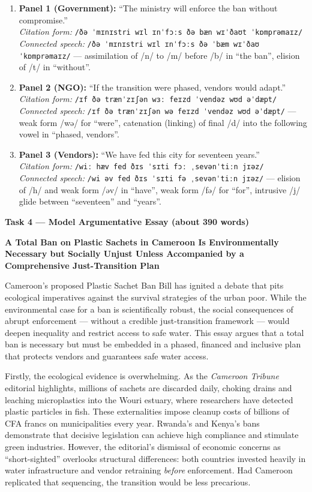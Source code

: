 \documentclass[11pt]{article}
\begin{document}
\begin{enumerate}
    \item \textbf{Panel 1 (Government):} ``The ministry will enforce the ban without compromise.'' \\
    \textit{Citation form:} \texttt{/ðə ˈmɪnɪstri wɪl ɪnˈfɔːs ðə bæn wɪˈðaʊt ˈkɒmprəmaɪz/} \\
    \textit{Connected speech:} \texttt{/ðə ˈmɪnɪstri wɪl ɪnˈfɔːs ðə ˈbæm wɪˈðaʊ ˈkɒmprəmaɪz/} --- assimilation of /n/ to /m/ before /b/ in ``the ban'', elision of /t/ in ``without''.
    \item \textbf{Panel 2 (NGO):} ``If the transition were phased, vendors would adapt.'' \\
    \textit{Citation form:} \texttt{/ɪf ðə trænˈzɪʃən wɜː feɪzd ˈvendəz wʊd əˈdæpt/} \\
    \textit{Connected speech:} \texttt{/ɪf ðə trænˈzɪʃən wə feɪzd ˈvendəz wʊd əˈdæpt/} --- weak form /wə/ for ``were'', catenation (linking) of final /d/ into the following vowel in ``phased, vendors''.
    \item \textbf{Panel 3 (Vendors):} ``We have fed this city for seventeen years.'' \\
    \textit{Citation form:} \texttt{/wiː hæv fed ðɪs ˈsɪti fɔː ˌsevənˈtiːn jɪəz/} \\
    \textit{Connected speech:} \texttt{/wi əv fed ðɪs ˈsɪti fə ˌsevənˈtiːn jɪəz/} --- elision of /h/ and weak form /əv/ in ``have'', weak form /fə/ for ``for'', intrusive /j/ glide between ``seventeen'' and ``years''.
\end{enumerate}

\textbf{Task 4 --- Model Argumentative Essay (about 390 words)}

\textbf{A Total Ban on Plastic Sachets in Cameroon Is Environmentally Necessary but Socially Unjust Unless Accompanied by a Comprehensive Just-Transition Plan}

Cameroon's proposed Plastic Sachet Ban Bill has ignited a debate that pits ecological imperatives against the survival strategies of the urban poor. While the environmental case for a ban is scientifically robust, the social consequences of abrupt enforcement --- without a credible just-transition framework --- would deepen inequality and restrict access to safe water. This essay argues that a total ban is necessary but must be embedded in a phased, financed and inclusive plan that protects vendors and guarantees safe water access.

Firstly, the ecological evidence is overwhelming. As the \textit{Cameroon Tribune} editorial highlights, millions of sachets are discarded daily, choking drains and leaching microplastics into the Wouri estuary, where researchers have detected plastic particles in fish. These externalities impose cleanup costs of billions of CFA francs on municipalities every year. Rwanda's and Kenya's bans demonstrate that decisive legislation can achieve high compliance and stimulate green industries. However, the editorial's dismissal of economic concerns as ``short-sighted'' overlooks structural differences: both countries invested heavily in water infrastructure and vendor retraining \emph{before} enforcement. Had Cameroon replicated that sequencing, the transition would be less precarious.
\end{document}
